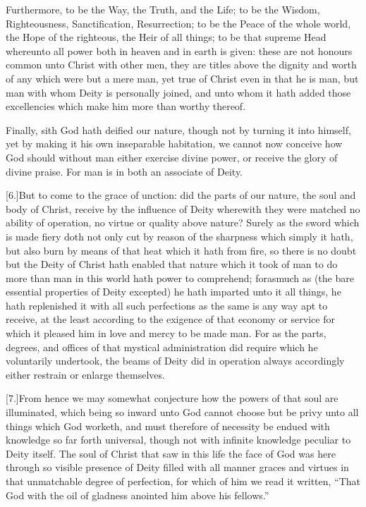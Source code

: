 Furthermore, to be the Way, the Truth, and the Life; to be the Wisdom, Righteousness, Sanctification, Resurrection; to be the Peace of the whole world, the Hope of the righteous, the Heir of all things; to be that supreme Head whereunto all power both in heaven and in earth is given: these are not honours common unto Christ with other men, they are titles above the dignity and worth of any which were but a mere man, yet true of Christ even in that he is man, but man with whom Deity is personally joined, and unto whom it hath added those excellencies which make him more than worthy thereof.

Finally, sith God hath deified our nature, though not by turning it into himself, yet by making it his own inseparable habitation, we cannot now conceive how God should without man either exercise divine power, or receive the glory of divine praise. For man is in both an associate of Deity.

[6.]But to come to the grace of unction: did the parts of our nature, the soul and body of Christ, receive by the influence  of Deity wherewith they were matched no ability of operation, no virtue or quality above nature?
 Surely as the sword which is made fiery doth not only cut by reason of the sharpness which simply it hath, but also burn by means of that heat which it hath from fire, so there is no doubt but the Deity of Christ hath enabled that nature which it took of man to do more than man in this world hath power to comprehend; forasmuch as (the bare essential properties of Deity excepted) he hath imparted unto it all things, he hath replenished it with all such perfections as the same is any way apt to receive, at the least according to the exigence of that economy or service for which it pleased him in love and mercy to be made man. For as the parts, degrees, and offices of that mystical administration did require which he voluntarily undertook, the beams of Deity did in operation always accordingly either restrain or enlarge themselves.

[7.]From hence we may somewhat conjecture how the powers of that soul are illuminated, which being so inward unto God cannot choose but be privy unto all things which God worketh, and must therefore of necessity be endued with knowledge so far forth universal, though not with infinite knowledge peculiar to Deity itself. The soul of Christ that saw in this life the face of God was here through so visible presence of Deity filled with all manner graces and virtues in that unmatchable degree of perfection, for which of him we read it written, “That God with the oil of gladness anointed him above his fellows.”

